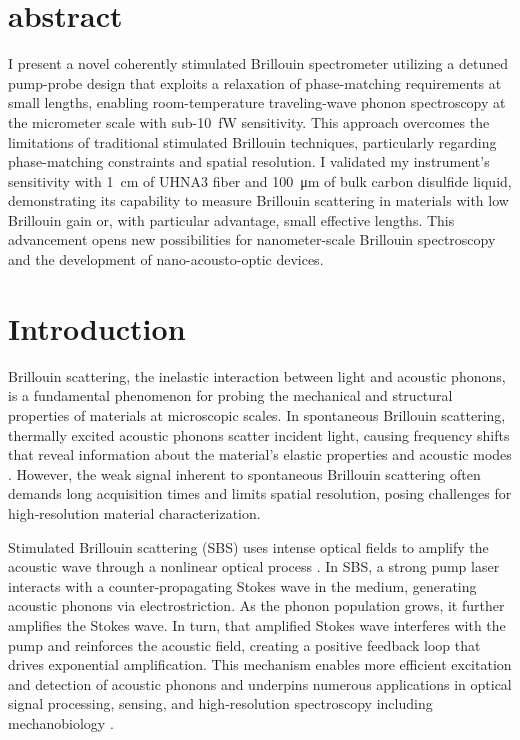 
\section{abstract}
I present a novel coherently stimulated Brillouin spectrometer utilizing a detuned pump-probe design that exploits a relaxation of phase-matching requirements at small lengths, enabling room-temperature traveling-wave phonon spectroscopy at the micrometer scale with sub-\SI{10}{\femto\watt} sensitivity. This approach overcomes the limitations of traditional stimulated Brillouin techniques, particularly regarding phase-matching constraints and spatial resolution. I validated my instrument’s sensitivity with \SI{1}{\centi\meter} of UHNA3 fiber and \SI{100}{\micro\meter} of bulk carbon disulfide liquid, demonstrating its capability to measure Brillouin scattering in materials with low Brillouin gain or, with particular advantage, small effective lengths. This advancement opens new possibilities for nanometer-scale Brillouin spectroscopy and the development of nano-acousto-optic devices.

\section{Introduction}
\label{sec:Introduction}

Brillouin scattering, the inelastic interaction between light and acoustic phonons, is a fundamental phenomenon for probing the mechanical and structural properties of materials at microscopic scales. In spontaneous Brillouin scattering, thermally excited acoustic phonons scatter incident light, causing frequency shifts that reveal information about the material’s elastic properties and acoustic modes \cite{boyd2020nonlinear}. However, the weak signal inherent to spontaneous Brillouin scattering often demands long acquisition times and limits spatial resolution, posing challenges for high‐resolution material characterization.

Stimulated Brillouin scattering (SBS) uses intense optical fields to amplify the acoustic wave through a nonlinear optical process \cite{chiao1964stimulated}. In SBS, a strong pump laser interacts with a counter‐propagating Stokes wave in the medium, generating acoustic phonons via electrostriction. As the phonon population grows, it further amplifies the Stokes wave. In turn, that amplified Stokes wave interferes with the pump and reinforces the acoustic field, creating a positive feedback loop that drives exponential amplification. This mechanism enables more efficient excitation and detection of acoustic phonons and underpins numerous applications in optical signal processing, sensing, and high‐resolution spectroscopy including mechanobiology \cite{eggleton2013inducing, fotiadi2023brillouin, kobyakov2009stimulated, ippen1972stimulated, speziale2014brillouin, palombo2019brillouin, dil1982brillouin, eggleton2019brillouin, prevedel2019brillouin, conrad2019mechanical}.

